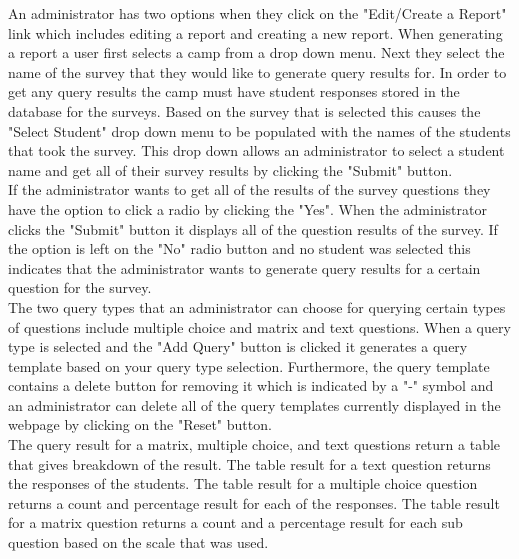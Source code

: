 \documentclass[../final.tex]{subfiles}
\begin{document}

	An administrator has two options when they click on the "Edit/Create a Report" link which includes editing a report and creating a new report. When generating a report a user first selects a camp from a drop down menu. Next they select the name of the survey that they would like to generate query results for. In order to get any query results the camp must have student responses stored in the database for the surveys. Based on the survey that is selected this causes the "Select Student" drop down menu to be populated with the names of the students that took the survey. This drop down allows an administrator to select a student name and get all of their survey results by clicking the "Submit" button.\\ 
	If the administrator wants to get all of the results of the survey questions they have the option to click a radio by clicking the "Yes". When the administrator clicks the "Submit" button it displays all of the question results of the survey. If the option is left on the "No" radio button and no student was selected this indicates that the administrator wants to generate query results for a certain question for the survey.\\ The two query types that an administrator can choose for querying certain types of questions include multiple choice and matrix and text questions. When a query type is selected and the "Add Query" button is clicked it generates a query template based on your query type selection. Furthermore, the query template contains a delete button for removing it which is indicated by a "-" symbol and an administrator can delete all of the query templates currently displayed in the webpage by clicking on the "Reset" button.\\
	 The query result for a matrix, multiple choice, and text questions return a table that gives breakdown of the result. The table result for a text question returns the responses of the students. The table result for a multiple choice question returns a count and percentage result for each of the responses. The table result for a matrix question returns a count and a percentage result for each sub question based on the scale that was used.\\
\end{document}
